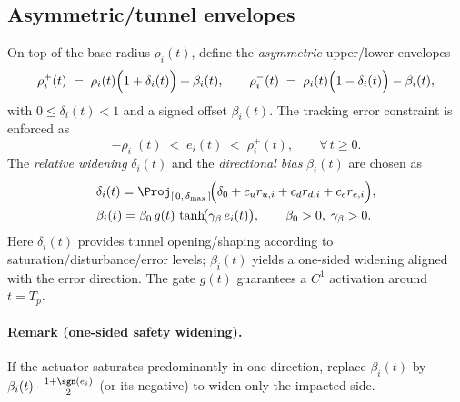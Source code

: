 \documentclass[pdflatex,sn-mathphys-num]{sn-jnl}%
\theoremstyle{thmstyleone}%
\theoremstyle{thmstyletwo}%
\theoremstyle{thmstylethree}%
\begin{document}
\subsection*{Asymmetric/tunnel envelopes}
On top of the base radius $\rho_i(t)$, define the \emph{asymmetric} upper/lower envelopes
\begin{equation}\label{eq:tunnel-def}
\rho_i^+(t) \;=\; \rho_i(t)\Bigl(1+\delta_i(t)\Bigr)+\beta_i(t),\qquad
\rho_i^-(t) \;=\; \rho_i(t)\Bigl(1-\delta_i(t)\Bigr)-\beta_i(t),
\end{equation}
with $0\le \delta_i(t)<1$ and a signed offset $\beta_i(t)$. The tracking error constraint is enforced as
\begin{equation}\label{eq:tunnel-constraint}
-\rho_i^-(t)\;<\; e_i(t)\;<\;\rho_i^+(t),\qquad \forall\, t\ge0.
\end{equation}
The \emph{relative widening} $\delta_i(t)$ and the \emph{directional bias} $\beta_i(t)$ are chosen as
\begin{align}
&\delta_i(t)=\Proj_{[\,0,\,\delta_{\max}\,]}\!\Bigl(\delta_0+c_u r_{u,i}+c_d r_{d,i}+c_e r_{e,i}\Bigr), \label{eq:delta-def}\\
&\beta_i(t)=\beta_0\, g(t)\,\tanh\!\bigl(\gamma_\beta\, e_i(t)\bigr), \qquad \beta_0>0,\;\gamma_\beta>0. \label{eq:beta-def}
\end{align}
Here $\delta_i(t)$ provides tunnel opening/shaping according to saturation/disturbance/error levels; $\beta_i(t)$ yields a one-sided widening aligned with the error direction. The gate $g(t)$ guarantees a $C^1$ activation around $t=T_p$.

\paragraph{Remark (one-sided safety widening).}
If the actuator saturates predominantly in one direction, replace $\beta_i(t)$ by $\beta_i(t)\cdot \tfrac{1+\sgn(e_i)}{2}$ (or its negative) to widen only the impacted side.
\end{document}

